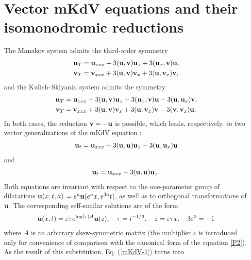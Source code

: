 \documentclass[11pt]{article}
\theoremstyle{plain}
\theoremstyle{definition}
\begin{document}
\section{Vector mKdV equations and their isomonodromic reductions}\label{s:mKdV}

The Manakov system admits the third-order symmetry
\begin{equation}\label{NLS-1-t3}
\begin{aligned}
 {\bf u}_T&= {\bf u}_{xxx}+3({\bf u},{\bf v}){\bf u}_x+3({\bf u}_x,{\bf v}){\bf u},\\
 {\bf v}_T&= {\bf v}_{xxx}+3({\bf u},{\bf v}){\bf v}_x+3({\bf u},{\bf v}_x){\bf v},
\end{aligned}
\end{equation}
and the Kulish--Sklyanin system admits the symmetry
\begin{equation}\label{NLS-2-t3}
\begin{aligned}
 {\bf u}_T&={\bf u}_{xxx}+3({\bf u},{\bf v}){\bf u}_x+3({\bf u}_x,{\bf v}){\bf u}-3({\bf u},{\bf u}_x){\bf v},\\
 {\bf v}_T&={\bf v}_{xxx}+3({\bf u},{\bf v}){\bf v}_x+3({\bf u},{\bf v}_x){\bf v}-3({\bf v},{\bf v}_x){\bf u}.
\end{aligned}
\end{equation}
In both cases, the reduction ${\bf v}=-{\bf u}$ is possible, which leads, respectively, to two vector generalizations of the mKdV equation \cite{Athorne_Fordy_1987, Sokolov_Svinolupov_1994}: 
\begin{equation}\label{mKdV-1}
 {\bf u}_t={\bf u}_{xxx}-3({\bf u},{\bf u}){\bf u}_x-3({\bf u},{\bf u}_x){\bf u}
\end{equation}
and
\begin{equation}\label{mKdV-2}
 {\bf u}_t={\bf u}_{xxx}-3({\bf u},{\bf u}){\bf u}_x.
\end{equation}
Both equations are invariant with respect to the one-parameter group of dilatations ${\bf u}(x,t,a)$ $=e^a{\bf u}(e^ax,e^{3a}t)$, as well as to orthogonal transformations of ${\bf u}$. The corresponding self-similar solutions are of the form
\begin{equation}\label{self}
 {\bf u}(x,t)= \varepsilon\tau e^{\log(\tau)A}{\bf u}(z),\quad 
 \tau=t^{-1/3},\quad z=\varepsilon\tau x,\quad 3\varepsilon^3=-1
\end{equation}
where $A$ is an arbitrary skew-symmetric matrix (the multiplier $\varepsilon$ is introduced only for convenience of comparison with the canonical form of the equation \ref{P2}). As the result of this substitution, Eq. (\ref{mKdV-1}) turns into
\end{document}
